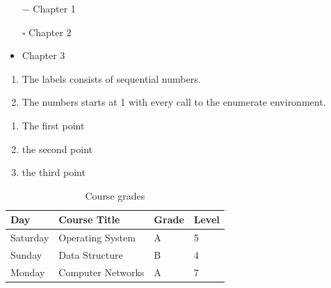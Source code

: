 \begin{itemize}     
	\item[$-$] Chapter 1      
	\item[$\square$] Chapter 2     
	 \item Chapter 3       
\end{itemize}

\begin{enumerate}
  \item The labels consists of sequential numbers.
  \item The numbers starts at 1 with every call to the enumerate environment.
\end{enumerate}

\begin{enumerate}
\item The first point
\item the second point
\item the third point
\end{enumerate}

\begin{table}[h]
\caption{Course grades}
\begin{center}
\begin{tabular}{llll}
\hline
Day      & Course Title      & Grade & Level \\ \hline
Saturday & Operating System  & A     & 5     \\ \hline
Sunday   & Data Structure    & B     & 4     \\ \hline
Monday   & Computer Networks & A     & 7     \\ \hline
\end{tabular}
\end{center}
\label{Tab4}
\end{table}